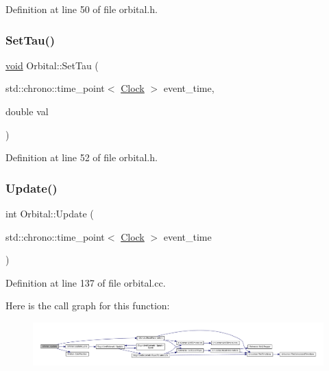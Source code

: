 Definition at line 50 of file orbital.\+h.

\mbox{\label{class_orbital_afd09baa67f1a9bff08c74dcf60e1398a}} 
\subsubsection{\texorpdfstring{Set\+Tau()}{SetTau()}}
{\footnotesize\ttfamily \mbox{\hyperlink{glad_8h_a950fc91edb4504f62f1c577bf4727c29}{void}} Orbital\+::\+Set\+Tau (\begin{DoxyParamCaption}\item[{std\+::chrono\+::time\+\_\+point$<$ \mbox{\hyperlink{universe_8h_a0ef8d951d1ca5ab3cfaf7ab4c7a6fd80}{Clock}} $>$}]{event\+\_\+time,  }\item[{double}]{val }\end{DoxyParamCaption})\hspace{0.3cm}{\ttfamily [inline]}}



Definition at line 52 of file orbital.\+h.

\mbox{\label{class_orbital_a837289c3b2af844724c381707dee40d0}} 
\subsubsection{\texorpdfstring{Update()}{Update()}}
{\footnotesize\ttfamily int Orbital\+::\+Update (\begin{DoxyParamCaption}\item[{std\+::chrono\+::time\+\_\+point$<$ \mbox{\hyperlink{universe_8h_a0ef8d951d1ca5ab3cfaf7ab4c7a6fd80}{Clock}} $>$}]{event\+\_\+time }\end{DoxyParamCaption})\hspace{0.3cm}{\ttfamily [virtual]}}



Definition at line 137 of file orbital.\+cc.

Here is the call graph for this function\+:\nopagebreak
\begin{figure}[H]
\begin{center}
\leavevmode
\includegraphics[width=350pt]{class_orbital_a837289c3b2af844724c381707dee40d0_cgraph}
\end{center}
\end{figure}
\mbox{\label{class_orbital_afbf72ba4e260627422c9f53dea793923}} 
